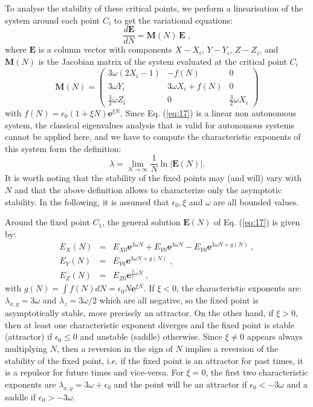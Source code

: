 \documentclass[twocolumn,preprintnumbers,amsmath,amssymb]{revtex4}
\begin{document}
To analyse the stability of these critical points, we perform a linearisation
of the system around each point $C_{i}$ to get the variational equations:
\begin{equation}\label{eq:17}
\frac{d\mathbf{E}}{dN}=\mathbf{M}(N)\,\mathbf{E}\;,
\end{equation}
where $\mathbf{E}$ is a column vector with components $X-X_{i}$,
$Y-Y_{i}$, $Z-Z_{i}$, and $\mathbf{M}(N)$ is the Jacobian matrix
of the system evaluated at the critical point $C_{i}$ 
\[
\mathbf{M}(N)=\left(\begin{array}{ccc}
3\omega(2X_{i}-1) & -f(N) & 0\\
3\omega Y_{i} & 3\omega X_{i}+f(N) & 0\\
{\displaystyle \frac{3}{2}\omega Z_{i}} & 0 & {\displaystyle \frac{3}{2}\omega X_{i}}
\end{array}\right)
\]
with $f(N)=\epsilon_{0}\left(1+\xi N\right)\mathbf{e}^{\xi N}$. Since
Eq. (\ref{eq:17}) is a linear non autonomous system, the classical
eigenvalues analysis that is valid for autonomous systems cannot be
applied here, and we have to compute the characteristic exponents
of this system form the definition:
\[
\lambda=\lim_{N\rightarrow\infty}\frac{1}{N}\ln\left|\mathbf{E}(N)\right|.
\]
It is worth noting that the stability of the fixed points may (and will) vary with $N$
and that the above definition allows to characterize only the 
asymptotic stability. In the following, it is assumed that $\epsilon_{0},\xi$ and $\omega$
are all bounded values.

Around the fixed point $C_{1}$, the general solution $\mathbf{E}(N)$
of Eq. (\ref{eq:17}) is given by:
\begin{eqnarray*}
E_{X}(N) & = & E_{X0}\mathbf{e}^{3\omega N}+E_{Y0}\mathbf{e}^{3\omega N}-E_{Y0}\mathbf{e}^{3\omega N+g(N)}\;,\\
E_{Y}(N) & = & E_{Y0}\mathbf{e}^{3\omega N+g(N)}\;,\\
E_{Z}(N) & = & E_{Z0}\mathbf{e}^{\frac{3}{2}\omega N}\;,
\end{eqnarray*}
with ${\displaystyle g(N)=\int f(N)dN=\epsilon_{0}N\mathbf{e}^{\xi N}}$.
If $\xi<0$, the characteristic exponents are: $\lambda_{x,y} = 3\omega $ and $\lambda_{z} = 3\omega /2$
which are all negative, so the fixed point is asymptotically stable,
more precisely an attractor.
On the other hand, if $\xi>0$, then at least one characteristic exponent
diverges and the fixed point is stable (attractor) if $\epsilon_{0}\leq0$ and unstable (saddle) otherwise. 
Since $\xi\neq0$ appears always multiplying $N$, then a reversion in the sign of $N$ implies a reversion of
the stability of the fixed point, i.e. if the fixed point
is an attractor for past times, it is a repulsor for future times
and vice-versa. For $\xi=0$, the first
two characteristic exponents are $\lambda_{x,y}=3\omega+\epsilon_{0}$
and the point will be an attractor if $\epsilon_{0}<-3\omega$ and a saddle if $\epsilon_{0}>-3\omega$. 
\end{document}
